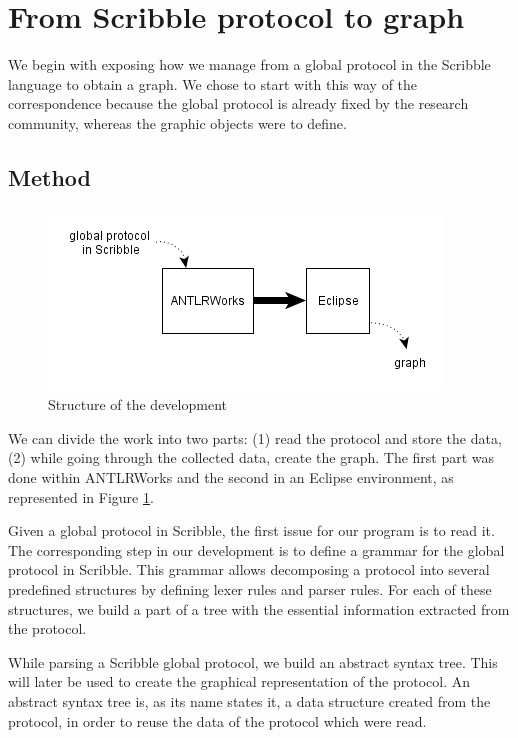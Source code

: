 \documentclass[a4paper,11pt,twoside]{report}
\begin{document}
\section{From Scribble protocol to graph}
We begin with exposing how we manage from a global protocol in the Scribble language to obtain a graph. We chose to start with this way of the correspondence because the global protocol is already fixed by the research community, whereas the graphic objects were to define.

\subsection{Method}
\begin{figure}[h]
\begin{center}
\includegraphics[scale=0.7]{generalstructure}
\end{center}
\caption{Structure of the development}\label{fig:generalstructure}
\end{figure}

We can divide the work into two parts: (1) read the protocol and store the data, (2) while going through the collected data, create the graph. The first part was done within ANTLRWorks and the second in an Eclipse environment, as represented in Figure \ref{fig:generalstructure}. 

Given a global protocol in Scribble, the first issue for our program is to read it. The corresponding step in our development is to define a grammar for the global protocol in Scribble. This grammar allows decomposing a protocol into several predefined structures by defining lexer rules and parser rules. For each of these structures, we build a part of a tree with the essential information extracted from the protocol.

While parsing a Scribble global protocol, we build an abstract syntax tree. This will later be used to create the graphical representation of the protocol. An abstract syntax tree is, as its name states it, a data structure created from the protocol, in order to reuse the data of the protocol which were read.
\end{document}
